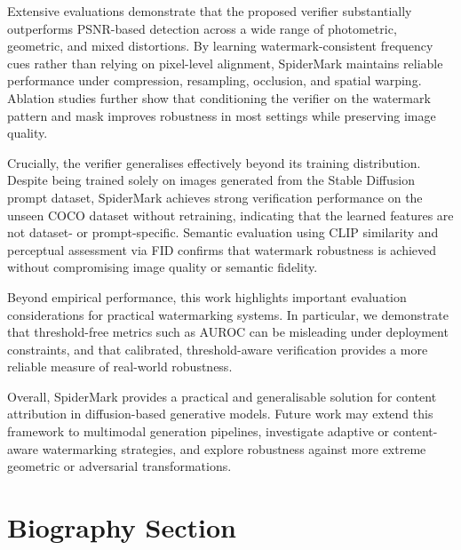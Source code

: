 \documentclass[lettersize,journal,review]{IEEEtran}
\begin{document}
Extensive evaluations demonstrate that the proposed verifier substantially outperforms PSNR-based detection across a wide range of photometric, geometric, and mixed distortions. By learning watermark-consistent frequency cues rather than relying on pixel-level alignment, SpiderMark maintains reliable performance under compression, resampling, occlusion, and spatial warping. Ablation studies further show that conditioning the verifier on the watermark pattern and mask improves robustness in most settings while preserving image quality.

Crucially, the verifier generalises effectively beyond its training distribution. Despite being trained solely on images generated from the Stable Diffusion prompt dataset, SpiderMark achieves strong verification performance on the unseen COCO dataset without retraining, indicating that the learned features are not dataset- or prompt-specific. Semantic evaluation using CLIP similarity and perceptual assessment via FID confirms that watermark robustness is achieved without compromising image quality or semantic fidelity.

Beyond empirical performance, this work highlights important evaluation considerations for practical watermarking systems. In particular, we demonstrate that threshold-free metrics such as AUROC can be misleading under deployment constraints, and that calibrated, threshold-aware verification provides a more reliable measure of real-world robustness.

Overall, SpiderMark provides a practical and generalisable solution for content attribution in diffusion-based generative models. Future work may extend this framework to multimodal generation pipelines, investigate adaptive or content-aware watermarking strategies, and explore robustness against more extreme geometric or adversarial transformations.







\newpage

\section{Biography Section}

 
\vspace{11pt}







\vfill
\end{document}
